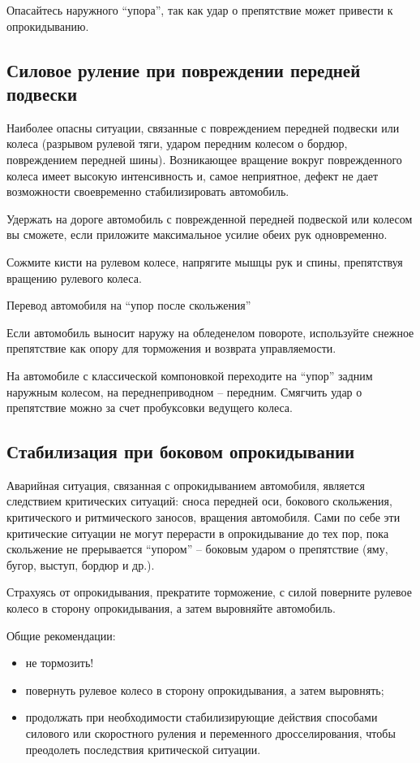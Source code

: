 Опасайтесь наружного “упора”, так как удар о препятствие может привести к опрокидыванию.

\subsection{Силовое руление при повреждении передней подвески}

Наиболее опасны ситуации, связанные с повреждением передней подвески или колеса (разрывом рулевой тяги, ударом передним колесом о бордюр, повреждением передней шины). Возникающее вращение вокруг поврежденного колеса имеет высокую интенсивность и, самое неприятное, дефект не дает возможности своевременно стабилизировать автомобиль.

Удержать на дороге автомобиль с поврежденной передней подвеской или колесом вы сможете, если приложите максимальное усилие обеих рук одновременно.

Сожмите кисти на рулевом колесе, напрягите мышцы рук и спины, препятствуя вращению рулевого колеса.

Перевод автомобиля на “упор после скольжения”

Если автомобиль выносит наружу на обледенелом повороте, используйте снежное препятствие как опору для торможения и возврата управляемости.

На автомобиле с классической компоновкой переходите на “упор” задним наружным колесом, на переднеприводном – передним. Смягчить удар о препятствие можно за счет пробуксовки ведущего колеса.

\subsection{Стабилизация при боковом опрокидывании}

Аварийная ситуация, связанная с опрокидыванием автомобиля, является следствием критических ситуаций: сноса передней оси, бокового скольжения, критического и ритмического заносов, вращения автомобиля. Сами по себе эти критические ситуации не могут перерасти в опрокидывание до тех пор, пока скольжение не прерывается “упором” – боковым ударом о препятствие (яму, бугор, выступ, бордюр и др.).

Страхуясь от опрокидывания, прекратите торможение, с силой поверните рулевое колесо в сторону опрокидывания, а затем выровняйте автомобиль.

Общие рекомендации:
\begin{itemize}
	\item не тормозить!
	\item повернуть рулевое колесо в сторону опрокидывания, а затем выровнять;
	\item продолжать при необходимости стабилизирующие действия способами силового или скоростного руления и переменного дросселирования, чтобы преодолеть последствия критической ситуации.
\end{itemize}

